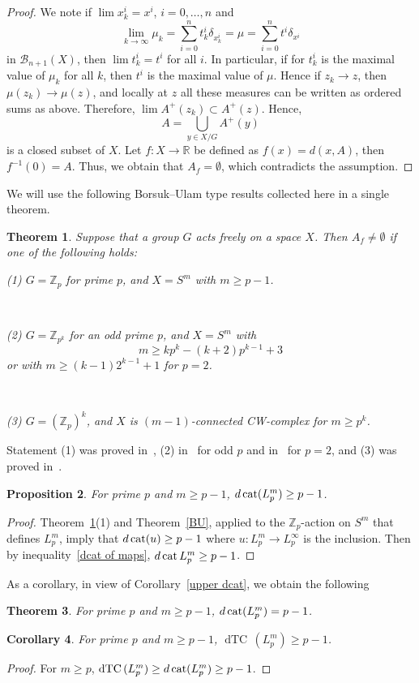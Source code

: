 \documentclass{amsart}
\numberwithin{equation}{section}
\theoremstyle{plain}
\newtheorem{thm}{Theorem}[subsection]
\newtheorem{cor}[thm]{Corollary}
\newtheorem{prop}[thm]{Proposition}
\theoremstyle{definition}
\def\dTC{{\mathop\mathrm{dTC}\,}}
\def\cat{\protect\operatorname{cat}}
\begin{document}
\begin{proof}
We note if $\lim x^i_k=x^i$, $i=0,\dots, n$ and 
$$\lim_{k\to\infty}\mu_k=\sum_{i=0}^n t_k^i\delta_{x^i_k}=\mu=\sum_{i=0}^n t^i\delta_{x^i} $$
 in $\mathcal B_{n+1}(X)$, then $\lim t^i_k=t^i$ for all $i$. In particular, if for $t^i_k$ is the maximal value of $\mu_k$ for all $k$, then $t^i$ is the maximal value of $\mu$.
Hence if $z_k\to z$, then $\mu(z_k)\to\mu(z)$, and locally at $z$ all these measures can be written as ordered sums as above. Therefore, $\lim A^+(z_k)\subset A^+(z)$.
Hence, $$A=\bigcup_{y\in X/G}A^+(y)$$ is a closed subset of $X$. Let $f:X\to\mathbb R$ be defined as $f(x)=d(x,A)$, then $f^{-1}(0)=A$. Thus,  we obtain that $A_f=\emptyset$, which contradicts the assumption.
\end{proof}

We will use the following Borsuk--Ulam type results collected here in a single theorem.
\begin{thm}\label{BU type}
Suppose that a group $G$ acts freely on a  space $X$. Then $A_f\ne \emptyset$ if one of the following holds:

{\rm (1)} $G=\mathbb Z_p$ for prime $p$, and $X=S^m$ with $m\ge p-1$. 

\

{\rm(2)} $G=\mathbb Z_{p^k}$ for an odd prime $p$, and $X=S^m$ with $$m\ge kp^k-(k+2)p^{k-1}+3$$ or with $m\ge (k-1)2^{k-1}+1$ for $p=2$. 

\

{\rm(3)}  $G=(\mathbb Z_p)^k$, and $X$ is $(m-1)$-connected CW-complex for $m\ge p^k$. 
\end{thm}
Statement  (1) was proved in~\cite{Mu1}, (2) in~\cite{Mu2} for odd $p$ and in~\cite{Tu} for $p=2$, and (3) was proved in~\cite{Vo}.


\begin{prop}
For prime $p$ and $m\ge p-1$, $d\cat(L^m_p)\ge p-1$.
\end{prop}
\begin{proof}
Theorem~\ref{BU type}(1) and Theorem~\ref{BU}, applied to the $\mathbb Z_p$-action on $S^m$ that defines $L^m_p$, imply that
$d\cat(u)\ge p-1$ where $u:L^m_p\to L^\infty_p$ is the inclusion. Then by inequality~\ref{dcat of maps}, $d\cat L^m_p\ge p-1$.
\end{proof}
As a corollary, in view of Corollary~\ref{upper dcat}, we obtain the following
\begin{thm}\label{=}
For prime $p$ and $m\ge p-1$, $d\cat(L^m_p)= p-1$.
\end{thm}
\begin{cor}
For prime $p$ and $m\ge p-1$, $\dTC(L^m_p)\ge p-1$.
\end{cor}
\begin{proof}
For $m\ge p$, $\dTC(L^m_p)\ge d\cat(L^m_p)\ge p-1$.
\end{proof}
\end{document}
